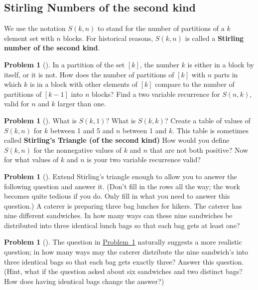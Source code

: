 \documentclass[10pt,]{book}
\newcommand{\terminology}[1]{\textbf{#1}}
\theoremstyle{plain}
\theoremstyle{definition}
\newtheorem{activity}[project]{Problem}
\theoremstyle{definition}
\numberwithin{equation}{chapter}
\begin{document}
\subsection[{Stirling Numbers of the second kind}]{Stirling Numbers of the second kind}\label{subsection-33}
We use the notation \(S(k,n)\) to stand for the number of partitions of a \(k\) element set with \(n\) blocks. For historical reasons, \(S(k,n)\) is called a \terminology{Stirling number of the second kind}. %
\begin{activity}[]\marginsymbol[-1em]{} \label{secondstirlingrecurrence}
In a partition of the set \([k]\), the number \(k\) is either in a block by itself, or it is not. How does the number of partitions of \([k]\) with \(n\) parts in which \(k\) is in a block with other elements of \([k]\) compare to the number of partitions of \([k-1]\) into \(n\) blocks? Find a two variable recurrence for \(S(n,k)\), valid for \(n\) and \(k\) larger than one.%
\end{activity}
\begin{activity}[]\marginsymbol[-1em]{} \label{activity-135}
What is \(S(k,1)\)? What is \(S(k,k)\)? Create a table of values of \(S(k,n)\) for \(k\) between 1 and 5 and \(n\) between 1 and \(k\). This table is sometimes called \terminology{Stirling's Triangle (of the second kind)} How would you define \(S(k,n)\) for the nonnegative values of \(k\) and \(n\) that are not both positive? Now for what values of \(k\) and \(n\) is your two variable recurrence valid?%
\end{activity}
\begin{activity}[]\marginsymbol[-1em]{} \label{sandwiches}
Extend Stirling's triangle enough to allow you to answer the following question and answer it. (Don't fill in the rows all the way; the work becomes quite tedious if you do. Only fill in what you need to answer this question.) A caterer is preparing three bag lunches for hikers. The caterer has nine different sandwiches. In how many ways can these nine sandwiches be distributed into three identical lunch bags so that each bag gets at least one?%
\end{activity}
\begin{activity}[]\marginsymbol[-1em]{} \label{caterer2}
The question in \hyperref[sandwiches]{Problem~\ref{sandwiches}} naturally suggests a more realistic question; in how many ways may the caterer distribute the nine sandwich's into three identical bags so that each bag gets exactly three? Answer this question. (Hint, what if the question asked about six sandwiches and two distinct bags? How does having identical bags change the answer?)%
\end{activity}
\end{document}
